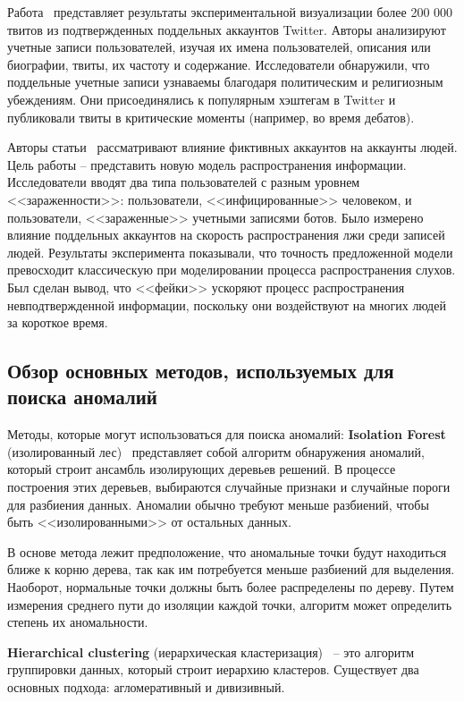 Работа~\cite{HsuKJ19} представляет результаты экспериментальной визуализации более 200 000 твитов из подтвержденных поддельных аккаунтов Twitter. Авторы анализируют учетные записи пользователей, изучая их имена пользователей, описания или биографии, твиты, их частоту и содержание. Исследователи обнаружили, что поддельные учетные записи узнаваемы благодаря политическим и религиозным убеждениям. Они присоединялись к популярным хэштегам в Twitter и публиковали твиты в критические моменты (например, во время дебатов).

Авторы статьи~\cite{FahmyAKE23} рассматривают влияние фиктивных аккаунтов на аккаунты людей. Цель работы – представить новую модель распространения информации. Исследователи вводят два типа пользователей с разным уровнем <<зараженности>>: пользователи, <<инфицированные>> человеком, и пользователи, <<зараженные>> учетными записями ботов. Было измерено влияние поддельных аккаунтов на скорость распространения лжи среди записей людей. Результаты эксперимента показывали, что точность предложенной модели превосходит классическую при моделировании процесса распространения слухов. Был сделан вывод, что <<фейки>> ускоряют процесс распространения невподтвержденной информации, поскольку они воздействуют на многих людей за короткое время.

\vspace{1.5em}
\subsection{Обзор основных методов, используемых для поиска аномалий}
\label{subsec:Variants}
Методы, которые могут использоваться для поиска аномалий:
\textbf{Isolation Forest} (изолированный лес)~\cite{LiuTZ08} представляет собой алгоритм обнаружения аномалий, который строит ансамбль изолирующих деревьев решений. В процессе построения этих деревьев, выбираются случайные признаки и случайные пороги для разбиения данных. Аномалии обычно требуют меньше разбиений, чтобы быть <<изолированными>> от остальных данных.

В основе метода лежит предположение, что аномальные точки будут находиться ближе к корню дерева, так как им потребуется меньше разбиений для выделения. Наоборот, нормальные точки должны быть более распределены по дереву. Путем измерения среднего пути до изоляции каждой точки, алгоритм может определить степень их аномальности.

\textbf{Hierarchical clustering} (иерархическая кластеризация)~\cite{clustering} – это алгоритм группировки данных, который строит иерархию кластеров. Существует два основных подхода: агломеративный и дивизивный.

